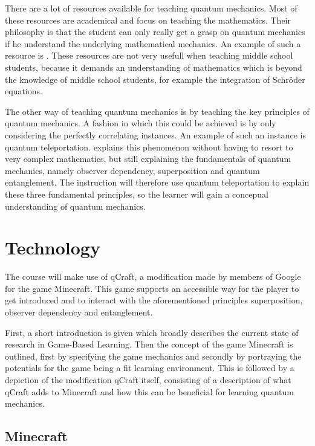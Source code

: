 \documentclass[12pt]{report} %
\begin{document}
There are a lot of resources available for teaching quantum mechanics. Most of these resources are academical and focus on teaching the mathematics. Their philosophy is that the student can only really get a grasp on quantum mechanics if he understand the underlying mathematical mechanics. An example of such a resource is . These resources are not very usefull when teaching middle school students, because it demands an understanding of mathematics which is beyond the knowledge of middle school students, for example the integration of Schröder equations.

The other way of teaching quantum mechanics is by teaching the key principles of quantum mechanics. A fashion in which this could be achieved is by only considering the perfectly correlating instances. An example of such an instance is quantum teleportation.  explains this phenomenon without having to resort to very complex mathematics, but still explaining the fundamentals of quantum mechanics, namely observer dependency, superposition and quantum entanglement. The instruction will therefore use quantum teleportation to explain these three fundamental principles, so the learner will gain a concepual understanding of quantum mechanics.

\section{Technology}

The course will make use of qCraft, a modification made by members of Google for the game Minecraft. This game supports an accessible way for the player to get introduced and to interact with the aforementioned principles superposition, observer dependency and entanglement.

First, a short introduction is given which broadly describes the current state of research in Game-Based Learning. Then the concept of the game Minecraft is outlined, first by specifying the game mechanics and secondly by portraying the potentials for the game being a fit learning environment. This is followed by a depiction of the modification qCraft itself, consisting of a description of what qCraft adds to Minecraft and how this can be beneficial for learning quantum mechanics. 

\subsection{Minecraft}
\end{document}
